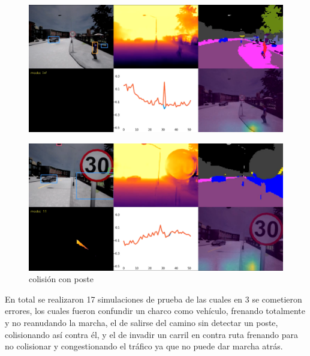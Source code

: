 \begin{figure}[H]
	\centering
	\includegraphics[scale=0.18]{imagenes/preds/crash1}
\end{figure}

\begin{figure}[H]
	\centering
	\includegraphics[scale=0.18]{imagenes/preds/crash2}
	\caption[Colisión con Poste]{colisión con poste}
	\label{colision}
\end{figure}

En total se realizaron 17 simulaciones de prueba de las cuales en 3 se cometieron errores, los cuales fueron confundir un charco como vehículo, frenando totalmente y no reanudando la marcha,  el de salirse del camino sin detectar un poste, colisionando así contra él, y el de invadir un carril en contra ruta frenando para no colisionar y congestionando el tráfico ya que no puede dar marcha atrás.